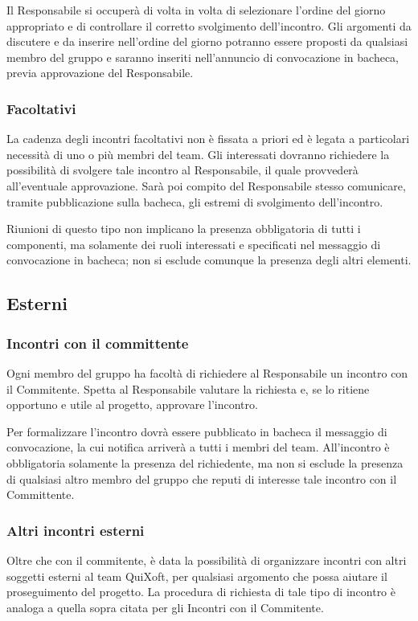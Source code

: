 \documentclass[11pt,a4paper]{article}
\begin{document}
Il Responsabile si occuperà di volta in volta di selezionare l'ordine del giorno appropriato e di controllare il corretto svolgimento dell'incontro.
Gli argomenti da discutere e da inserire nell'ordine del giorno potranno essere proposti da qualsiasi membro del gruppo e saranno inseriti nell'annuncio di convocazione in bacheca, previa approvazione del Responsabile.
\subsubsection{Facoltativi}
La cadenza degli incontri facoltativi non è fissata a priori ed è legata a particolari necessità di uno o più membri del team.
Gli interessati dovranno richiedere la possibilità di svolgere tale incontro al Responsabile, il quale provvederà all'eventuale approvazione.
Sarà poi compito del Responsabile stesso comunicare, tramite pubblicazione sulla bacheca, gli estremi di svolgimento dell'incontro.

Riunioni di questo tipo non implicano la presenza obbligatoria di tutti i componenti, ma solamente dei ruoli interessati e specificati nel messaggio di convocazione in bacheca; non si esclude comunque la presenza degli altri elementi.
\subsection{Esterni}
\subsubsection{Incontri con il committente}
Ogni membro del gruppo ha facoltà di richiedere al Responsabile un incontro con il Commitente.
Spetta al Responsabile valutare la richiesta e, se lo ritiene opportuno e utile al progetto, approvare l'incontro.

Per formalizzare l'incontro dovrà essere pubblicato in bacheca il messaggio di convocazione, la cui notifica arriverà a tutti i membri del team.
All'incontro è obbligatoria solamente la presenza del richiedente, ma non si esclude la presenza di qualsiasi altro membro del gruppo che reputi di interesse tale incontro con il Committente.
\subsubsection{Altri incontri esterni}
Oltre che con il commitente, è data la possibilità di organizzare incontri con altri soggetti esterni al team QuiXoft, per qualsiasi argomento che possa aiutare il proseguimento del progetto.
La procedura di richiesta di tale tipo di incontro è analoga a quella sopra citata per gli Incontri con il Commitente.
\end{document}
